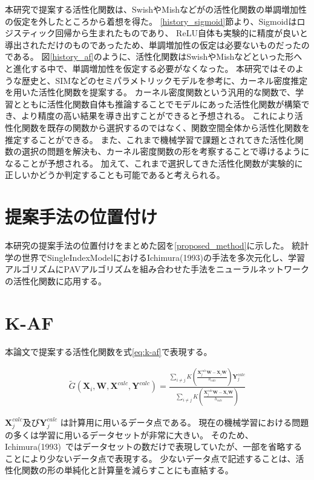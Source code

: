 本研究で提案する活性化関数は、SwishやMishなどがの活性化関数の単調増加性の仮定を外したところから着想を得た。
\ref{history_sigmoid}節より、Sigmoidはロジスティック回帰から生まれたものであり、
ReLU自体も実験的に精度が良いと導出されただけのものであったため、単調増加性の仮定は必要ないものだったのである。
図\ref{history_af}のように、活性化関数はSwishやMishなどといった形へと進化する中で、単調増加性を仮定する必要がなくなった。
本研究ではそのような歴史と、SIMなどのセミパラメトリックモデルを参考に、カーネル密度推定を用いた活性化関数を提案する。
カーネル密度関数という汎用的な関数で、学習とともに活性化関数自体も推論することでモデルにあった活性化関数が構築でき、より精度の高い結果を導き出すことができると予想される。
これにより活性化関数を既存の関数から選択するのではなく、関数空間全体から活性化関数を推定することができる。
また、これまで機械学習で課題とされてきた活性化関数の選択の問題を解決も、カーネル密度関数の形を考察することで導けるようになることが予想される。
加えて、これまで選択してきた活性化関数が実験的に正しいかどうか判定することも可能であると考えられる。



\section{提案手法の位置付け}
\label {position_proposed}

本研究の提案手法の位置付けをまとめた図を\ref{proposed_method}に示した。
統計学の世界でSingleIndexModelにおけるIchimura(1993)の手法を多次元化し、学習アルゴリズムにPAVアルゴリズムを組み合わせた手法をニューラルネットワークの活性化関数に応用する。



\section{K-AF}
\label {math}
本論文で提案する活性化関数を式\ref{eq:k-af}で表現する。

\begin{eqnarray}
\tilde{G}(\mathbf{X}_i, \mathbf{W}, \mathbf{X}^{calc}, \mathbf{Y}^{calc})=\frac{\sum_{i\neq j} K\left(\frac{\mathbf{X}^{calc}_j \mathbf{W} - \mathbf{X}_i \mathbf{W}}{h_{calc}}\right)\mathbf{Y}^{calc}_j}{\sum_{i\neq j} K\left(\frac{\mathbf{X}^{calc}_j \mathbf{W} - \mathbf{X}_i \mathbf{W}}{h_{calc}}\right)}
\label{eq:k-af}
\end{eqnarray}


$ \mathbf{X}^{calc}_j $及び$ \mathbf{Y}^{calc}_j $ は計算用に用いるデータ点である。
現在の機械学習における問題の多くは学習に用いるデータセットが非常に大きい。
そのため、Ichimura(1993)~\cite{ichimura}ではデータセットの数だけで表現していたが、一部を省略することにより少ないデータ点で表現する。
少ないデータ点で記述することは、活性化関数の形の単純化と計算量を減らすことにも直結する。

